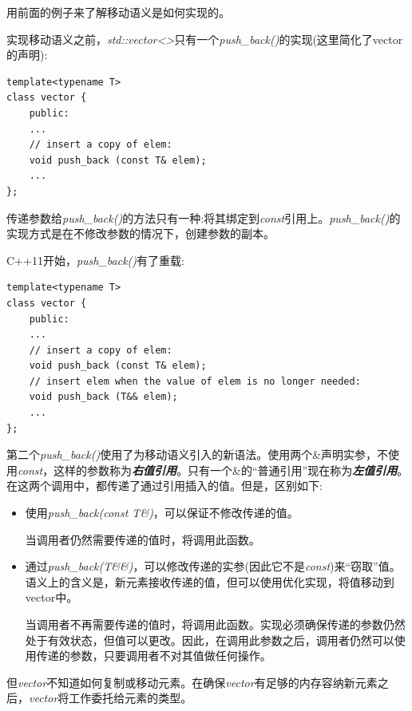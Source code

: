 用前面的例子来了解移动语义是如何实现的。\par

实现移动语义之前，\textit{std::vector<>}只有一个\textit{push\_back()}的实现(这里简化了vector的声明):\par

\begin{lstlisting}[caption={}]
template<typename T>
class vector {
	public:
	...
	// insert a copy of elem:
	void push_back (const T& elem);
	...
};
\end{lstlisting}

传递参数给\textit{push\_back()}的方法只有一种:将其绑定到\textit{const}引用上。\textit{push\_back()}的实现方式是在不修改参数的情况下，创建参数的副本。\par

C++11开始，\textit{push\_back()}有了重载:\par

\begin{lstlisting}[caption={}]
template<typename T>
class vector {
	public:
	...
	// insert a copy of elem:
	void push_back (const T& elem);
	// insert elem when the value of elem is no longer needed:
	void push_back (T&& elem);
	...
};
\end{lstlisting}

第二个\textit{push\_back()}使用了为移动语义引入的新语法。使用两个\&声明实参，不使用\textit{const}，这样的参数称为\textit{\textbf{右值引用}}。只有一个\&的“普通引用”现在称为\textit{\textbf{左值引用}}。在这两个调用中，都传递了通过引用插入的值。但是，区别如下:\par

\begin{itemize}
	\item 使用\textit{push\_back(const T\&)}，可以保证不修改传递的值。\par
	当调用者仍然需要传递的值时，将调用此函数。
	\item 通过\textit{push\_back(T\&\&)}，可以修改传递的实参(因此它不是\textit{const})来“窃取”值。语义上的含义是，新元素接收传递的值，但可以使用优化实现，将值移动到vector中。\par
	当调用者不再需要传递的值时，将调用此函数。实现必须确保传递的参数仍然处于有效状态，但值可以更改。因此，在调用此参数之后，调用者仍然可以使用传递的参数，只要调用者不对其值做任何操作。
\end{itemize}

但\textit{vector}不知道如何复制或移动元素。在确保\textit{vector}有足够的内存容纳新元素之后，\textit{vector}将工作委托给元素的类型。\par

